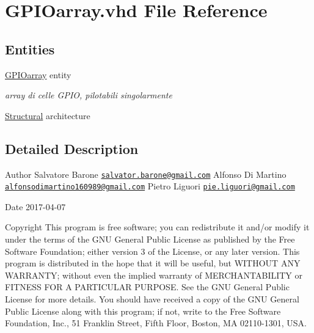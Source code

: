 \hypertarget{_g_p_i_oarray_8vhd}{\section{G\+P\+I\+Oarray.\+vhd File Reference}
\label{_g_p_i_oarray_8vhd}
}
\subsection*{Entities}
\begin{DoxyCompactItemize}
\item 
\hyperlink{class_g_p_i_oarray}{G\+P\+I\+Oarray} entity
\begin{DoxyCompactList}\small\item\em array di celle G\+P\+I\+O, pilotabili singolarmente \end{DoxyCompactList}\item 
\hyperlink{class_g_p_i_oarray_1_1_structural}{Structural} architecture
\end{DoxyCompactItemize}


\subsection{Detailed Description}
\begin{DoxyAuthor}{Author}
Salvatore Barone \href{mailto:salvator.barone@gmail.com}{\tt salvator.\+barone@gmail.\+com} Alfonso Di Martino \href{mailto:alfonsodimartino160989@gmail.com}{\tt alfonsodimartino160989@gmail.\+com} Pietro Liguori \href{mailto:pie.liguori@gmail.com}{\tt pie.\+liguori@gmail.\+com} 
\end{DoxyAuthor}
\begin{DoxyDate}{Date}
2017-\/04-\/07 
\end{DoxyDate}
\begin{DoxyCopyright}{Copyright}
This program is free software; you can redistribute it and/or modify it under the terms of the G\+N\+U General Public License as published by the Free Software Foundation; either version 3 of the License, or any later version. This program is distributed in the hope that it will be useful, but W\+I\+T\+H\+O\+U\+T A\+N\+Y W\+A\+R\+R\+A\+N\+T\+Y; without even the implied warranty of M\+E\+R\+C\+H\+A\+N\+T\+A\+B\+I\+L\+I\+T\+Y or F\+I\+T\+N\+E\+S\+S F\+O\+R A P\+A\+R\+T\+I\+C\+U\+L\+A\+R P\+U\+R\+P\+O\+S\+E. See the G\+N\+U General Public License for more details. You should have received a copy of the G\+N\+U General Public License along with this program; if not, write to the Free Software Foundation, Inc., 51 Franklin Street, Fifth Floor, Boston, M\+A 02110-\/1301, U\+S\+A. 
\end{DoxyCopyright}
